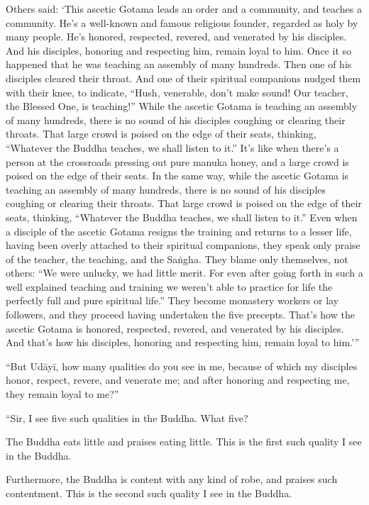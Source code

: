 \documentclass[12pt,openany]{book}%
\begin{document}
Others said: ‘This ascetic Gotama leads an order and a community, and teaches a community. He’s a well-known and famous religious founder, regarded as holy by many people. He’s honored, respected, revered, and venerated by his disciples. And his disciples, honoring and respecting him, remain loyal to him. Once it so happened that he was teaching an assembly of many hundreds. Then one of his disciples cleared their throat. And one of their spiritual companions nudged them with their knee, to indicate, “Hush, venerable, don’t make sound! Our teacher, the Blessed One, is teaching!” While the ascetic Gotama is teaching an assembly of many hundreds, there is no sound of his disciples coughing or clearing their throats. That large crowd is poised on the edge of their seats, thinking, “Whatever the Buddha teaches, we shall listen to it.” It’s like when there’s a person at the crossroads pressing out pure manuka honey, and a large crowd is poised on the edge of their seats. In the same way, while the ascetic Gotama is teaching an assembly of many hundreds, there is no sound of his disciples coughing or clearing their throats. That large crowd is poised on the edge of their seats, thinking, “Whatever the Buddha teaches, we shall listen to it.” Even when a disciple of the ascetic Gotama resigns the training and returns to a lesser life, having been overly attached to their spiritual companions, they speak only praise of the teacher, the teaching, and the \textsanskrit{Saṅgha}. They blame only themselves, not others: “We were unlucky, we had little merit. For even after going forth in such a well explained teaching and training we weren’t able to practice for life the perfectly full and pure spiritual life.” They become monastery workers or lay followers, and they proceed having undertaken the five precepts. That’s how the ascetic Gotama is honored, respected, revered, and venerated by his disciples. And that’s how his disciples, honoring and respecting him, remain loyal to him.’” 

“But \textsanskrit{Udāyī}, how many qualities do you see in me, because of which my disciples honor, respect, revere, and venerate me; and after honoring and respecting me, they remain loyal to me?” 

“Sir, I see five such qualities in the Buddha. What five? 

The Buddha eats little and praises eating little. This is the first such quality I see in the Buddha. 

Furthermore, the Buddha is content with any kind of robe, and praises such contentment. This is the second such quality I see in the Buddha. 
\end{document}

